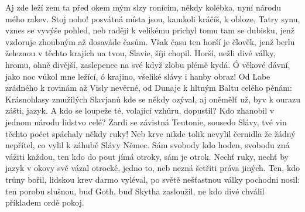 
Aj zde leží zem ta před okem mým slzy ronícím,
někdy kolébka, nyní národu mého rakev.
Stoj noho! posvátná místa jsou, kamkoli kráčíš,
k obloze, Tatry synu, vznes se vyvýše pohled,
neb raději k velikému prichyl tomu tam se dubisku,
jenž vzdoruje zhoubným až dosaváde časům.
Však času ten horší je člověk, jenž berlu železnou
v těchto krajích na tvou, Slavie, šíji chopil.
Horší, nežli divé války, hromu, ohně divější,
zaslepenec na své když zlobu plémě kydá.
Ó věkové dávní, jako noc vůkol mne ležící,
ó krajino, všeliké slávy i hanby obraz!
Od Labe zrádného k rovinám až Visly nevěrné,
od Dunaje k hltným Baltu celého pěnám:
Krásnohlasy zmužilých Slavjanů kde se někdy ozýval,
aj oněmělť už, byv k ourazu zášti, jazyk.
A kdo se loupeže té, volající vzhůru, dopustil?
Kdo zhanobil v jednom národu lidstvo celé?
Zardi se závistná Teutonie, sousedo Slávy,
tvé vin těchto počet spáchaly někdy ruky!
Neb krve nikde tolik nevylil černidla že žádný
nepřítel, co vylil k záhubě Slávy Němec.
Sám svobody kdo hoden, svobodu zná vážiti každou,
ten kdo do pout jímá otroky, sám je otrok.
Nechť ruky, nechť by jazyk v okovy své vázal otrocké,
jedno to, neb nezná šetřiti práva jiných.
Ten, kdo trůny bořil, lidskou krev darmo vyléval,
po světě nešťastnou války pochodni nosil:
ten porobu slušnou, buď Goth, buď Skytha zasloužil,
ne kdo divé chválil příkladem ordě pokoj.
